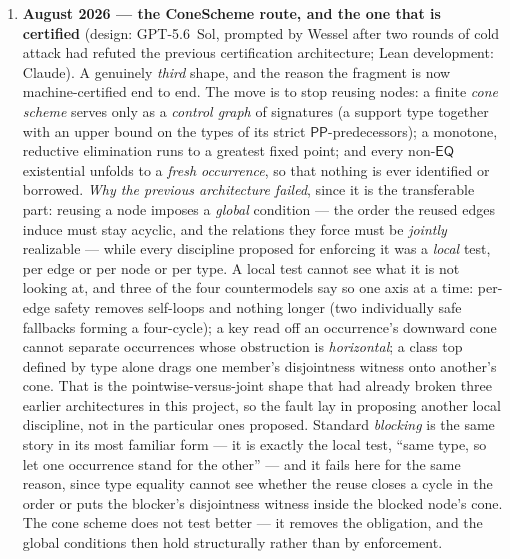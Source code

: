 \documentclass[11pt]{article}
\newcommand{\PO}{\ensuremath{\mathsf{PO}}}
\newcommand{\PP}{\ensuremath{\mathsf{PP}}}
\newcommand{\EQ}{\ensuremath{\mathsf{EQ}}}
\newcommand{\code}[1]{\texttt{#1}}
\begin{document}
\begin{enumerate}
  run. Both known incompleteness patterns need a $\forall\PO$ and cannot arise
  in the fragment, which is what makes the agreement evidence; it is not a
  proof, and a suite with zero mismatches has twice missed a defect of the
  tableau (\code{ERRATA.md}).
\item \textbf{August 2026 --- the ConeScheme route, and the one that is
  certified} (design: GPT-5.6~Sol, prompted by Wessel after two rounds of
  cold attack had refuted the previous certification architecture; Lean
  development: Claude). A genuinely \emph{third} shape, and the reason the
  fragment is now machine-certified end to end. The move is to stop reusing
  nodes: a finite \emph{cone scheme} serves only as a \emph{control graph} of
  signatures (a support type together with an upper bound on the types of
  its strict $\PP$-predecessors); a monotone, reductive elimination runs to
  a greatest fixed point; and every non-$\EQ$ existential unfolds to a
  \emph{fresh occurrence}, so that nothing is ever identified or borrowed.
  \emph{Why the previous architecture failed}, since it is the transferable
  part: reusing a node imposes a \emph{global} condition --- the order the
  reused edges induce must stay acyclic, and the relations they force must be
  \emph{jointly} realizable --- while every discipline proposed for enforcing it
  was a \emph{local} test, per edge or per node or per type. A local test cannot
  see what it is not looking at, and three of the four countermodels say so one
  axis at a time: per-edge safety removes self-loops and nothing longer (two individually
  safe fallbacks forming a four-cycle); a key read off an occurrence's downward
  cone cannot separate occurrences whose obstruction is \emph{horizontal}; a
  class top defined by type alone drags one member's disjointness witness onto
  another's cone. That is the pointwise-versus-joint shape that had already
  broken three earlier architectures in this project, so the fault lay in
  proposing another local discipline, not in the particular ones proposed.
  Standard \emph{blocking} is the same story in its most familiar form --- it
  is exactly the local test, ``same type, so let one occurrence stand for the
  other'' --- and it fails here for the same reason, since type equality cannot
  see whether the reuse closes a cycle in the order or puts the blocker's
  disjointness witness inside the blocked node's cone. The
  cone scheme does not test better --- it removes the obligation, and the global
  conditions then hold structurally rather than by enforcement.


\end{enumerate}
\end{document}
